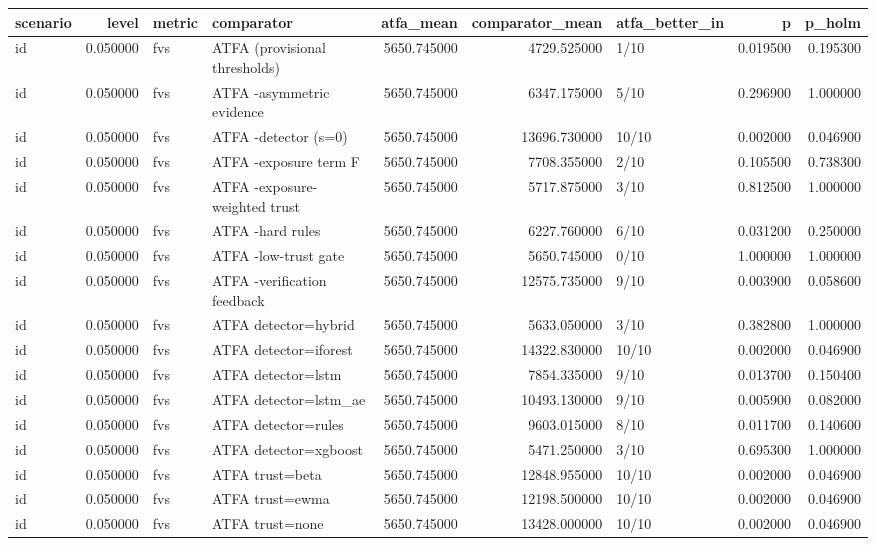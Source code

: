 \begin{tabular}{lrllrrlrr}
\toprule
scenario & level & metric & comparator & atfa\_mean & comparator\_mean & atfa\_better\_in & p & p\_holm \\
\midrule
id & 0.050000 & fvs & ATFA (provisional thresholds) & 5650.745000 & 4729.525000 & 1/10 & 0.019500 & 0.195300 \\
id & 0.050000 & fvs & ATFA -asymmetric evidence & 5650.745000 & 6347.175000 & 5/10 & 0.296900 & 1.000000 \\
id & 0.050000 & fvs & ATFA -detector (s=0) & 5650.745000 & 13696.730000 & 10/10 & 0.002000 & 0.046900 \\
id & 0.050000 & fvs & ATFA -exposure term F & 5650.745000 & 7708.355000 & 2/10 & 0.105500 & 0.738300 \\
id & 0.050000 & fvs & ATFA -exposure-weighted trust & 5650.745000 & 5717.875000 & 3/10 & 0.812500 & 1.000000 \\
id & 0.050000 & fvs & ATFA -hard rules & 5650.745000 & 6227.760000 & 6/10 & 0.031200 & 0.250000 \\
id & 0.050000 & fvs & ATFA -low-trust gate & 5650.745000 & 5650.745000 & 0/10 & 1.000000 & 1.000000 \\
id & 0.050000 & fvs & ATFA -verification feedback & 5650.745000 & 12575.735000 & 9/10 & 0.003900 & 0.058600 \\
id & 0.050000 & fvs & ATFA detector=hybrid & 5650.745000 & 5633.050000 & 3/10 & 0.382800 & 1.000000 \\
id & 0.050000 & fvs & ATFA detector=iforest & 5650.745000 & 14322.830000 & 10/10 & 0.002000 & 0.046900 \\
id & 0.050000 & fvs & ATFA detector=lstm & 5650.745000 & 7854.335000 & 9/10 & 0.013700 & 0.150400 \\
id & 0.050000 & fvs & ATFA detector=lstm\_ae & 5650.745000 & 10493.130000 & 9/10 & 0.005900 & 0.082000 \\
id & 0.050000 & fvs & ATFA detector=rules & 5650.745000 & 9603.015000 & 8/10 & 0.011700 & 0.140600 \\
id & 0.050000 & fvs & ATFA detector=xgboost & 5650.745000 & 5471.250000 & 3/10 & 0.695300 & 1.000000 \\
id & 0.050000 & fvs & ATFA trust=beta & 5650.745000 & 12848.955000 & 10/10 & 0.002000 & 0.046900 \\
id & 0.050000 & fvs & ATFA trust=ewma & 5650.745000 & 12198.500000 & 10/10 & 0.002000 & 0.046900 \\
id & 0.050000 & fvs & ATFA trust=none & 5650.745000 & 13428.000000 & 10/10 & 0.002000 & 0.046900 \\

\end{tabular}
